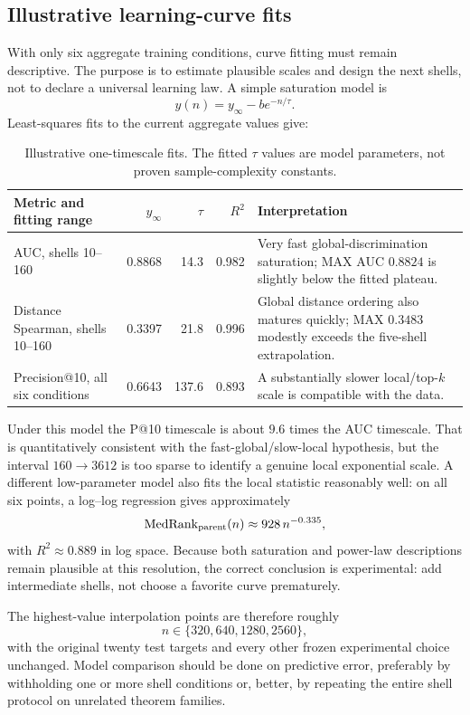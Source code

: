 \subsection{Illustrative learning-curve fits}
With only six aggregate training conditions, curve fitting must remain descriptive. The purpose is to estimate plausible scales and design the next shells, not to declare a universal learning law. A simple saturation model is
\[
 y(n)=y_\infty-b e^{-n/\tau}.
\]
Least-squares fits to the current aggregate values give:
\begin{table}[ht]
\centering
\small
\begin{tabularx}{\textwidth}{lrrrX}
\toprule
Metric and fitting range & $y_\infty$ & $\tau$ & $R^2$ & Interpretation\\
\midrule
AUC, shells 10--160 & 0.8868 & 14.3 & 0.982 & Very fast global-discrimination saturation; MAX AUC $0.8824$ is slightly below the fitted plateau.\\
Distance Spearman, shells 10--160 & 0.3397 & 21.8 & 0.996 & Global distance ordering also matures quickly; MAX $0.3483$ modestly exceeds the five-shell extrapolation.\\
Precision@10, all six conditions & 0.6643 & 137.6 & 0.893 & A substantially slower local/top-$k$ scale is compatible with the data.\\
\bottomrule
\end{tabularx}
\caption{Illustrative one-timescale fits. The fitted $\tau$ values are model parameters, not proven sample-complexity constants.}
\end{table}

Under this model the P@10 timescale is about $9.6$ times the AUC timescale. That is quantitatively consistent with the fast-global/slow-local hypothesis, but the interval $160\to3612$ is too sparse to identify a genuine local exponential scale. A different low-parameter model also fits the local statistic reasonably well: on all six points, a log--log regression gives approximately
\[
 \operatorname{MedRank}_{\rm parent}(n)\approx 928\,n^{-0.335},
\]
with $R^2\approx0.889$ in log space. Because both saturation and power-law descriptions remain plausible at this resolution, the correct conclusion is experimental: add intermediate shells, not choose a favorite curve prematurely.

The highest-value interpolation points are therefore roughly
\[
 n\in\{320,640,1280,2560\},
\]
with the original twenty test targets and every other frozen experimental choice unchanged. Model comparison should be done on predictive error, preferably by withholding one or more shell conditions or, better, by repeating the entire shell protocol on unrelated theorem families.


